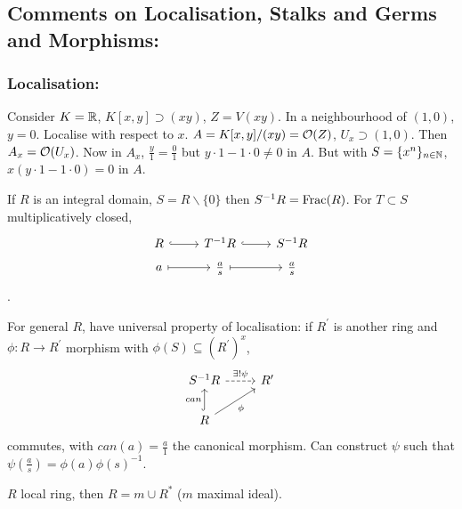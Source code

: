 \documentclass[a4paper,11pt]{article}
\begin{document}
			{\color{gray}\subsection*{Comments on Localisation, Stalks and Germs and Morphisms:}
			
				\subsubsection*{Localisation:}

					\begin{eg}
						Consider $K=\mathbb{R}$, $K[x,y]\supset(xy)$, $Z=V(xy)$. In a neighbourhood of $(1,0)$, $y=0$. Localise with respect to $x$. $A=K[x,y]/(xy)=\mathcal{O}(Z)$, $U_x\supset(1,0)$. Then $A_x=\mathcal{O}(U_x)$. Now in $A_x$, $\frac{y}{1}=\frac{0}{1}$ but $y\cdot1-1\cdot0\neq0$ in $A$. But with $S=\{x^n\}_{n\in\mathbb{N}}$, $x(y\cdot1-1\cdot0)=0$ in $A$.
					\end{eg}

					\begin{remark}
						If $R$ is an integral domain, $S=R\backslash\{0\}$ then $S^{-1}R=\operatorname{Frac}(R)$. For $T\subset S$ multiplicatively closed,
						\begin{equation*}
							\begin{tikzcd}[row sep=tiny]
								R\ar[r,hook] & T^{-1}R\ar[r,hook] & S^{-1}R\\
								a\ar[r,mapsto] & \frac{a}{s}\ar[r,mapsto] & \frac{a}{s}
							\end{tikzcd}
						\end{equation*}.
					\end{remark}

					\begin{remark}
						For general $R$, have universal property of localisation: if $R^\prime$ is another ring and $\phi:R\rightarrow R^\prime$ morphism with $\phi(S)\subseteq(R^\prime)^x$,
						\begin{equation*}
							\begin{tikzcd}
								S^{-1}R\ar[r,dashed,"\exists !\psi"] & R^\prime\\
								R\ar[u,hook,"can"]\ar[ur,"\phi"'] &  
							\end{tikzcd}
						\end{equation*}
						commutes, with $can(a)=\frac{a}{1}$ the canonical morphism. Can construct $\psi$ such that $\psi(\frac{a}{s})=\phi(a)\phi(s)^{-1}$.
					\end{remark}

					\begin{remark}
						$R$ local ring, then $R=m\cup R^\ast$ ($m$ maximal ideal).
					\end{remark}

}
\end{document}
